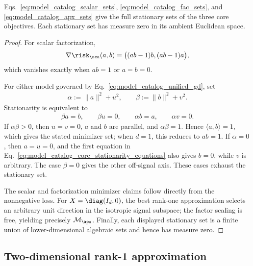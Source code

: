 \documentclass{article}
\begin{document}
\begin{proposition}
\label{prop:model_catalog_core_stationary}
Eqs.~\eqref{eq:model_catalog_scalar_sets},
\eqref{eq:model_catalog_fac_sets}, and
\eqref{eq:model_catalog_apx_sets} give the full stationary sets of the three
core objectives. Each stationary set has measure zero in its ambient Euclidean
space.
\end{proposition}

\begin{proof}
For scalar factorization,
\begin{align}
    \nabla\risk_\sca(a,b)=\bigl((ab-1)b,(ab-1)a\bigr),
\end{align}
which vanishes exactly when $ab=1$ or $a=b=0$.

For either model governed by Eq.~\eqref{eq:model_catalog_unified_gd}, set
\begin{align}
    \alpha:=\|a\|^2+u^2,
    \qquad
    \beta:=\|b\|^2+v^2.
\end{align}
Stationarity is equivalent to
\begin{align}
    \beta a=b,
    \qquad
    \beta u=0,
    \qquad
    \alpha b=a,
    \qquad
    \alpha v=0.
    \label{eq:model_catalog_core_stationarity_equations}
\end{align}
If $\alpha\beta>0$, then $u=v=0$, $a$ and $b$ are parallel, and
$\alpha\beta=1$. Hence $\langle a,b\rangle=1$, which gives the stated
minimizer set; when $d=1$, this reduces to $ab=1$. If $\alpha=0$, then
$a=u=0$, and the first equation in
Eq.~\eqref{eq:model_catalog_core_stationarity_equations} also gives $b=0$,
while $v$ is arbitrary. The case $\beta=0$ gives the other off-signal axis.
These cases exhaust the stationary set.

The scalar and factorization minimizer claims follow directly from the
nonnegative loss. For $X=\diag(I_d,0)$, the best rank-one approximation selects
an arbitrary unit direction in the isotropic signal subspace; the factor
scaling is free, yielding precisely $\mathcal M_\apx$. Finally, each displayed
stationary set is a finite union of lower-dimensional algebraic sets and hence
has measure zero.
\end{proof}

\subsection{Two-dimensional rank-1 approximation}
\label{subsec:model_catalog_two_mode}
\end{document}
